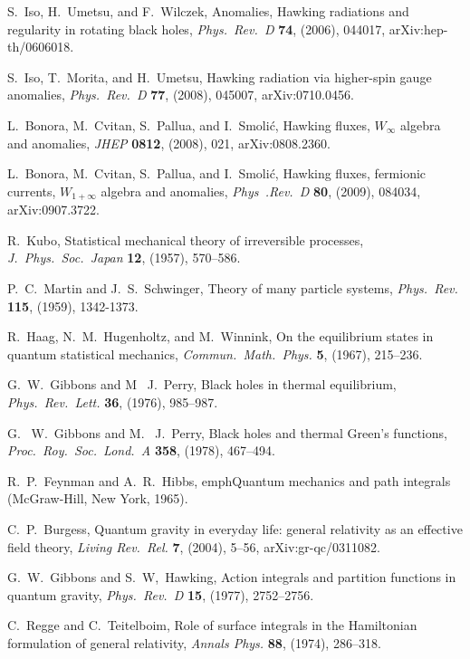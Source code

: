 \documentclass[11pt]{article}
\begin{document}
\begin{thebibliography}{999}
 S.\ Iso, H.\ Umetsu, and F.\ Wilczek, Anomalies, 
Hawking radiations and regularity in rotating black holes,
\emph{Phys.\ Rev.\ D} {\bf 74}, (2006), 044017, arXiv:hep-th/0606018.

 S.\ Iso, T.\ Morita, and H.\ Umetsu, Hawking radiation 
via higher-spin gauge anomalies, \emph{Phys.\ Rev.\ D} {\bf 77}, 
(2008), 045007, arXiv:0710.0456. 

 L.\ Bonora, M.\ Cvitan, S.\ Pallua, and I.\ Smoli{\'c},
Hawking fluxes, $W_\infty$ algebra and anomalies, \emph{JHEP} 
{\bf 0812}, (2008), 021, arXiv:0808.2360.

 L.\ Bonora, M.\ Cvitan, S.\ Pallua, and I.\ Smoli{\'c},
Hawking fluxes, fermionic currents, $W_{1+\infty}$ algebra and 
anomalies, \emph{Phys\ .Rev.\ D} {\bf 80}, (2009), 084034,
arXiv:0907.3722.

 R.\ Kubo, Statistical mechanical theory of irreversible 
processes, \emph{J.\ Phys.\ Soc.\ Japan} {\bf 12}, (1957), 570--586.

 P.~C.\ Martin and J.~S.\ Schwinger, Theory of 
many particle systems, \emph{Phys.\ Rev.} {\bf 115}, (1959),
1342-1373.

 R.\ Haag,  N.~M.\ Hugenholtz, and M.\ Winnink,
On the equilibrium states in quantum statistical mechanics,
\emph{Commun.\ Math.\ Phys.} {\bf 5}, (1967), 215--236.

  G.~W.\ Gibbons and M~ J.\ Perry, Black holes in 
thermal equilibrium, \emph{Phys.\ Rev.\ Lett.} {\bf 36}, (1976),
985--987.

 G.~ W.\ Gibbons and M.~ J.\ Perry, Black holes 
and thermal Green's functions, \emph{Proc.\ Roy.\ Soc.\
Lond.\ A} {\bf 358}, (1978), 467--494.

  R.~P.\ Feynman and A.~R.\ Hibbs, emph{Quantum
mechanics and path integrals} (McGraw-Hill, New York, 1965).

 C.~P.\ Burgess, Quantum gravity in everyday life: 
general relativity as an effective field theory, \emph{Living Rev.\ Rel.}
{\bf 7}, (2004), 5--56, arXiv:gr-qc/0311082.

 G.~W.\ Gibbons and S.~W,\ Hawking, Action 
integrals and partition functions in quantum gravity,
\emph{Phys.\ Rev.\ D} {\bf 15}, (1977), 2752--2756.

 C.\ Regge and C.\ Teitelboim, Role of surface 
integrals in the Hamiltonian formulation of general relativity,
\emph{Annals Phys.} {\bf 88}, (1974), 286--318.


\end{thebibliography}
\end{document}
